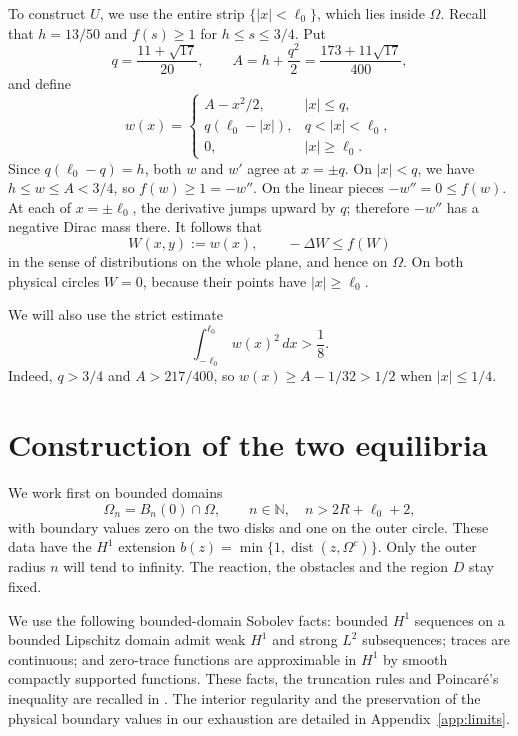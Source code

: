 \documentclass[11pt]{article}
\begin{document}
To construct \(U\), we use the entire strip
\(\{|x|<\ell_0\}\), which lies inside \(\Omega\). Recall that
\(h=13/50\) and \(f(s)\ge1\) for \(h\le s\le3/4\). Put
\[
 q=\frac{11+\sqrt{17}}{20},\qquad
 A=h+\frac{q^2}{2}=\frac{173+11\sqrt{17}}{400},
\]
and define
\begin{equation}\label{eq:w}
 w(x)=
 \begin{cases}
  A-x^2/2,&|x|\le q,\\
  q(\ell_0-|x|),&q<|x|<\ell_0,\\
  0,&|x|\ge\ell_0.
 \end{cases}
\end{equation}
Since \(q(\ell_0-q)=h\), both \(w\) and \(w'\) agree at
\(x=\pm q\). On \(|x|<q\), we have \(h\le w\le A<3/4\),
so \(f(w)\ge1=-w''\). On the linear pieces \(-w''=0\le f(w)\).
At each of \(x=\pm\ell_0\), the derivative jumps upward by \(q\);
therefore \(-w''\) has a negative Dirac mass there. It follows that
\begin{equation}\label{eq:subsolution}
 W(x,y):=w(x),\qquad -\Delta W\le f(W)
\end{equation}
in the sense of distributions on the whole plane, and hence on
\(\Omega\). On both physical circles \(W=0\), because their points
have \(|x|\ge\ell_0\).

We will also use the strict estimate
\begin{equation}\label{eq:strip-mass}
 \int_{-\ell_0}^{\ell_0}w(x)^2\,dx>\frac18.
\end{equation}
Indeed, \(q>3/4\) and \(A>217/400\), so
\(w(x)\ge A-1/32>1/2\) when \(|x|\le1/4\).

\section{Construction of the two equilibria}\label{sec:solutions}

We work first on bounded domains
\[
 \Omega_n=B_n(0)\cap\Omega,\qquad
 n\in\mathbb N,\quad n>2R+\ell_0+2,
\]
with boundary values zero on the two disks and one on the outer circle.
These data have the \(H^1\) extension
\(b(z)=\min\{1,\operatorname{dist}(z,\Omega^c)\}\).
Only the outer radius \(n\) will tend to infinity. The reaction,
the obstacles and the region \(D\) stay fixed.

We use the following bounded-domain Sobolev facts: bounded \(H^1\)
sequences on a bounded Lipschitz domain admit weak \(H^1\) and strong
\(L^2\) subsequences; traces are continuous; and zero-trace functions
are approximable in \(H^1\) by smooth compactly supported functions.
These facts, the truncation rules and Poincar\'e's inequality are
recalled in \cite[Section~1.1]{FRRO}.
The interior regularity and the preservation of the physical boundary
values in our exhaustion are detailed in Appendix~\ref{app:limits}.
\end{document}
